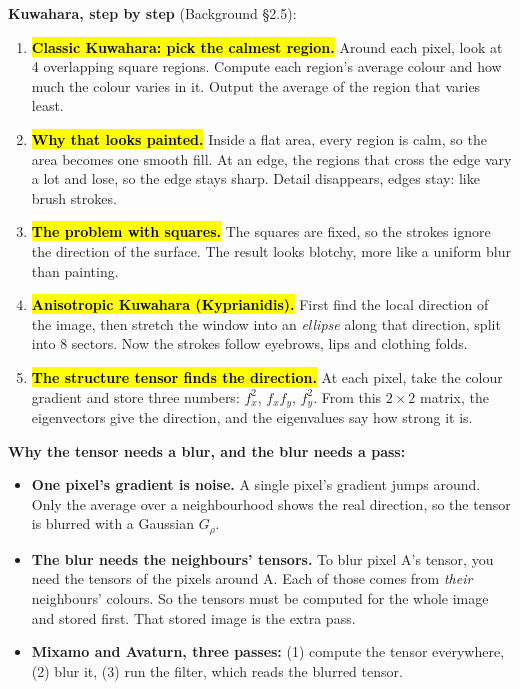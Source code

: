 \documentclass[11pt,a4paper]{article}
\newcommand{\key}[1]{\hl{#1}}
\begin{document}
\textbf{Kuwahara, step by step} (Background §2.5):
\begin{enumerate}[leftmargin=1.4em,itemsep=0.1em,topsep=0.2em]
  \item \key{\textbf{Classic Kuwahara: pick the calmest region.}} Around each pixel, look at 4 overlapping square regions. Compute each region's average colour and how much the colour varies in it. Output the average of the region that varies least.
  \item \key{\textbf{Why that looks painted.}} Inside a flat area, every region is calm, so the area becomes one smooth fill. At an edge, the regions that cross the edge vary a lot and lose, so the edge stays sharp. Detail disappears, edges stay: like brush strokes.
  \item \key{\textbf{The problem with squares.}} The squares are fixed, so the strokes ignore the direction of the surface. The result looks blotchy, more like a uniform blur than painting.
  \item \key{\textbf{Anisotropic Kuwahara (Kyprianidis).}} First find the local direction of the image, then stretch the window into an \emph{ellipse} along that direction, split into 8 sectors. Now the strokes follow eyebrows, lips and clothing folds.
  \item \key{\textbf{The structure tensor finds the direction.}} At each pixel, take the colour gradient and store three numbers: $f_x^2$, $f_xf_y$, $f_y^2$. From this $2\times2$ matrix, the eigenvectors give the direction, and the eigenvalues say how strong it is.
\end{enumerate}

\textbf{Why the tensor needs a blur, and the blur needs a pass:}
\begin{itemize}
  \item \textbf{One pixel's gradient is noise.} A single pixel's gradient jumps around. Only the average over a neighbourhood shows the real direction, so the tensor is blurred with a Gaussian $G_\rho$.
  \item \textbf{The blur needs the neighbours' tensors.} To blur pixel A's tensor, you need the tensors of the pixels around A. Each of those comes from \emph{their} neighbours' colours. So the tensors must be computed for the whole image and stored first. That stored image is the extra pass.
  \item \textbf{Mixamo and Avaturn, three passes:} (1) compute the tensor everywhere, (2) blur it, (3) run the filter, which reads the blurred tensor.
\end{itemize}
\end{document}
